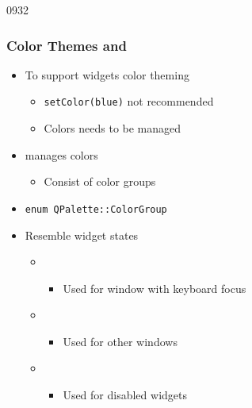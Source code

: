 \begin{slide}{0932}\frametitle{Color Themes and }
\begin{itemize}
  \item To support widgets color theming
  \begin{itemize}
    \item \texttt{setColor(blue)} not recommended
    \item Colors needs to be managed
  \end{itemize} 
  \item {} manages colors
  \begin{itemize}
    \item Consist of color groups
  \end{itemize}     
\end{itemize}     
\vspace{5mm}
\begin{itemize}
  \item \texttt{enum QPalette::ColorGroup}
  \item Resemble widget states 
  \begin{itemize}
    \item {} 
    \begin{itemize}    
    	\item Used for window with keyboard focus
    \end{itemize}    
    \item {}
    \begin{itemize}    
    	\item Used for other windows
    \end{itemize}    
    \item {}
    \begin{itemize}    
    	\item Used for disabled widgets
    \end{itemize}    
  \end{itemize}     
\end{itemize}
\end{slide}

